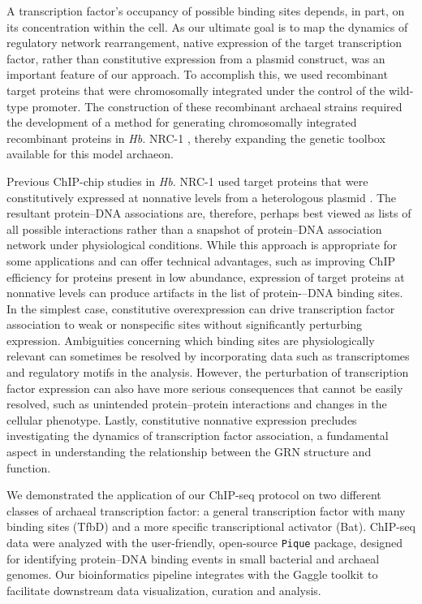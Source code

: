 A transcription factor's occupancy of possible binding sites depends, in part, on its concentration within the cell. As our ultimate goal is to map the dynamics of regulatory network rearrangement, native expression of the target transcription factor, rather than constitutive expression from a plasmid construct, was an important feature of our approach. To accomplish this, we used recombinant target proteins that were chromosomally integrated under the control of the wild-type promoter. The construction of these recombinant archaeal strains required the development of a method for generating chromosomally integrated recombinant proteins in {\em Hb.} NRC-1 , thereby expanding the genetic toolbox available for this model archaeon.

Previous ChIP-chip studies in {\em Hb.} NRC-1 used target proteins that were constitutively expressed at nonnative levels from a heterologous plasmid \cite{facciotti_general_2007, schmid2011two, schmid2009single}. The resultant protein–DNA associations are, therefore, perhaps best viewed as lists of all possible interactions rather than a snapshot of protein–DNA association network under physiological conditions. While this approach is appropriate for some applications and can offer technical advantages, such as improving ChIP efficiency for proteins present in low abundance, expression of target proteins at nonnative levels can produce artifacts in the list of protein-–DNA binding sites. In the simplest case, constitutive overexpression can drive transcription factor association to weak or nonspecific sites without significantly perturbing expression. Ambiguities concerning which binding sites are physiologically relevant can sometimes be resolved by incorporating data such as transcriptomes and regulatory motifs in the analysis. However, the perturbation of transcription factor expression can also have more serious consequences that cannot be easily resolved, such as unintended protein–protein interactions and changes in the cellular phenotype. Lastly, constitutive nonnative expression precludes investigating the dynamics of transcription factor association, a fundamental aspect in understanding the relationship between the GRN structure and function.

We demonstrated the application of our ChIP-seq protocol on two different classes of archaeal transcription factor: a general transcription factor with many binding sites (TfbD) and a more specific transcriptional activator (Bat). ChIP-seq data were analyzed with the user-friendly, open-source {\tt Pique} package, designed for identifying protein–DNA binding events in small bacterial and archaeal genomes. Our bioinformatics pipeline integrates with the Gaggle toolkit to facilitate downstream data visualization, curation and analysis.

